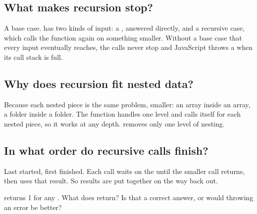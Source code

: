 \label{ch:c09}

\subsection{What makes recursion stop?}%
A base case.  has two kinds of input: a , answered directly, and a recursive case, which calls the function again on something smaller. Without a base case that every input eventually reaches, the calls never stop and JavaScript throws a  when its call stack is full.

\subsection{Why does recursion fit nested data?}%
Because each nested piece is the same problem, smaller: an array inside an array, a folder inside a folder. The function handles one level and calls itself for each nested piece, so it works at any depth.  removes only one level of nesting.

\subsection{In what order do recursive calls finish?}%
Last started, first finished. Each call waits on the  until the smaller call returns, then uses that result. So results are put together on the way back out.

\begin{ponder} returns 1 for any . What does  return? Is that a correct answer, or would throwing an error be better?\end{ponder}
